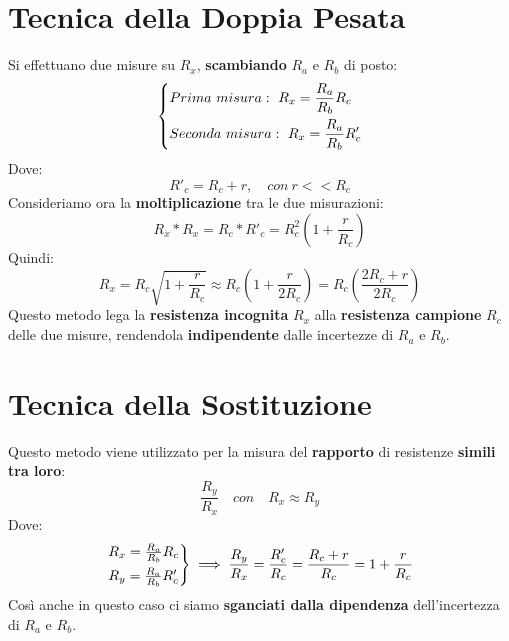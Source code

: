 \section{Tecnica della Doppia Pesata}
Si effettuano due misure su $R_x$, \textbf{scambiando} $R_a$ e $R_b$ di posto:
\begin{equation*}
    \begin{dcases}
        Prima \ misura: \ R_x = \frac{R_a}{R_b} R_c\\
        Seconda \ misura: \ R_x = \frac{R_a}{R_b} R'_c
    \end{dcases}
\end{equation*}
Dove:
\begin{equation*}
    R'_c = R_c + r, \quad con \ r<< R_c
\end{equation*}
Consideriamo ora la \textbf{moltiplicazione} tra le due misurazioni:
\begin{equation*}
    R_x * R_x = R_c * R'_c = R_c^2 \left(1 + \frac{r}{R_c}\right)
\end{equation*}
Quindi:
\begin{equation*}
    R_x = R_c \sqrt{1 + \frac{r}{R_c}} \approx R_c \left(1 + \frac{r}{2R_c}\right) = R_c\left(\frac{2R_c + r}{2R_c}\right)
\end{equation*}
Questo metodo lega la \textbf{resistenza incognita} $R_x$ alla \textbf{resistenza campione} $R_c$ delle due misure, rendendola \textbf{indipendente} dalle incertezze di $R_a$ e $R_b$.
\section{Tecnica della Sostituzione}
Questo metodo viene utilizzato per la misura del \textbf{rapporto} di resistenze \textbf{simili tra loro}:
\begin{equation*}
    \frac{R_y}{R_x} \quad con \quad R_x \approx R_y
\end{equation*}
Dove:
\begin{equation*}
\begin{rcases}
    R_x = \frac{R_a}{R_b} R_c\\
    R_y = \frac{R_a}{R_b} R'_c
\end{rcases}
\implies \frac{R_y}{R_x} = \frac{R'_c}{R_c} = \frac{R_c + r}{R_c} = 1 + \frac{r}{R_c}
\end{equation*}
Così anche in questo caso ci siamo \textbf{sganciati dalla dipendenza} dell'incertezza di $R_a$ e $R_b$.
